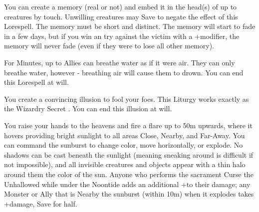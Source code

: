 \begin{multicols*}{2}
\cbreak


\LITURGY [
  Name = Memory Lane,
  Link = arcana-mystery-memory-lane,
  Paradigm = Cunning,
  Duration = See Below
]

You can create a memory (real or not) and embed it in the head(s) of up to \DICE creatures by touch.  Unwilling creatures may Save to negate the effect of this Lorespell.  The memory must be short and distinct.  The memory will start to fade in a few days, but if you win an \RBTRY{\FOC}{\FOC} try against the victim with a +\DICE modifier, the memory will never fade (even if they were to lose all other memory). 


\LITURGY [
  Name = Mermaid's Breath,
  Link = arcana-mystery-mermaids-breath,
  Paradigm = Cthonic,
  Duration = Session
]

For \SUMDICE Minutes, up to \DICE Allies can breathe water as if it were air.  They can only breathe water, however - breathing air will cause them to drown. You can end this Lorespell at will.

\newpage

\LITURGY [
  Name = Mirage,
  Link = arcana-mystery-mirage,
  Paradigm = Cunning,
  Duration = Session
]

You create a convincing illusion to fool your foes. This Liturgy works exactly as the Wizardry Secret . You can end this illusion at will.


\LITURGY [
  Name = Noontide,
  Link = arcana-mystery-noontide,
  Paradigm = Empyrean,
  Duration = Session
]

You raise your hands to the heavens and fire a flare up to 50m upwards, where it hovers providing bright sunlight to all areas Close, Nearby, and Far-Away.  You can command the sunburst to change color, move horizontally, or explode.  No shadows can be cast beneath the sunlight (meaning sneaking around is difficult if not impossible), and all invisible creatures and objects appear with a thin halo around them the color of the sun.  Anyone who performs the sacrament Curse the Unhallowed while under the Noontide adds an additional +\DICE to their damage; any  Monster or Ally that is Nearby the sunburst (within 10m) when it explodes takes \SUMDICE+\DICE damage, Save for half.

\LITURGY [
  Name = Plague,
  Link = arcana-mystery-plague,
  Paradigm = Ruinous,
  Duration = Session
]


\end{multicols*}
